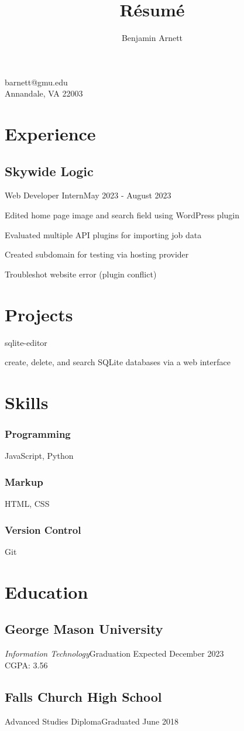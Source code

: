 \documentclass{article}
\makeatletter
\renewcommand{\maketitle}{
\begin{center}
{\huge\bfseries\theauthor}

\vspace{.25em}

barnett@gmu.edu \\
Annandale, VA 22003

\end{center}
}
\makeatother
\begin{document}
\title{R\'esum\'e}
\author{Benjamin Arnett}

\maketitle

\section{Experience}
\subsection{Skywide Logic}
Web Developer Intern\hfill May 2023 - August 2023\par
Edited home page image and search field using WordPress plugin\par
Evaluated multiple API plugins for importing job data\par
Created subdomain for testing via hosting provider\par
Troubleshot website error (plugin conflict)


\section{Projects}

sqlite-editor \par
create, delete, and search SQLite databases via a web interface

\section{Skills}



\subsubsection{Programming}

JavaScript, Python

\subsubsection{Markup}

HTML, CSS

\subsubsection{Version Control}

Git

\section{Education}

\subsection{George Mason University}
\emph{Information Technology}\hfill Graduation Expected December 2023\\CGPA: 3.56


\subsection{Falls Church High School}
Advanced Studies Diploma\hfill Graduated June 2018
\end{document}

